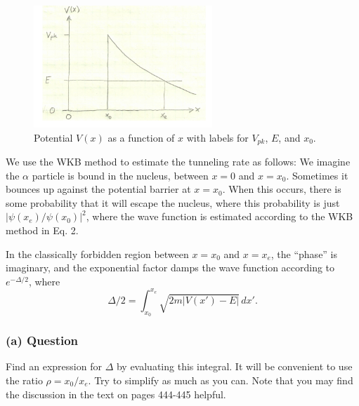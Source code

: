 \documentclass{article}
\begin{document}
\begin{figure}[h!]
    \centering
    \includegraphics[width=0.6\textwidth]{figure.png}
    \caption{Potential \( V(x) \) as a function of \( x \) with labels for \( V_{pk} \), \( E \), and \( x_0 \).}
\end{figure}

We use the WKB method to estimate the tunneling rate as follows: We imagine the \( \alpha \) particle is bound in the nucleus, between \( x = 0 \) and \( x = x_0 \). Sometimes it bounces up against the potential barrier at \( x = x_0 \). When this occurs, there is some probability that it will escape the nucleus, where this probability is just \( |\psi(x_e)/\psi(x_0)|^2 \), where the wave function is estimated according to the WKB method in Eq. 2.

In the classically forbidden region between \( x = x_0 \) and \( x = x_e \), the ``phase'' is imaginary, and the exponential factor damps the wave function according to \( e^{-\Delta/2} \), where
\begin{equation}
    \Delta/2 = \int_{x_0}^{x_e} \sqrt{2m\lvert V(x') - E \rvert}\,dx'.
\end{equation}

\subsubsection*{(a) Question}
Find an expression for \( \Delta \) by evaluating this integral. It will be convenient to use the ratio \( \rho = x_0/x_e \). Try to simplify as much as you can. Note that you may find the discussion in the text on pages 444-445 helpful.
\end{document}
